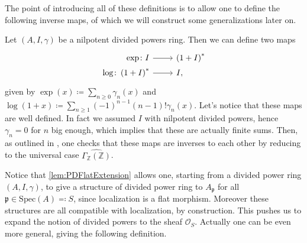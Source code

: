 \noindent
The point of introducing all of these definitions is to allow one to define the following
inverse maps, of which we will construct some generalizations later on.
\begin{defn}[]\label{defn:PDExponential}
	Let $\left(A, I, \gamma\right)$ be a nilpotent divided powers ring.
	Then we can define two maps
	\begin{equation*}
	\begin{tikzcd}[row sep = 0ex
		,/tikz/column 1/.append style={anchor=base east}
		,/tikz/column 2/.append style={anchor=base west}]
		\exp\colon I \arrow[r, "", rightarrow] &
		\left( 1 + I \right)^*\\
		\log\colon \left( 1 + I \right)^* \arrow[r, "", rightarrow] &
		I
	,\end{tikzcd}
	\end{equation*} 
	given by 
	$\exp (x) \coloneqq \sum_{n\geq 0} \gamma_n(x)$
	and $\log (1+x) \coloneqq \sum_{n\geq 1} 
	(-1)^{n-1} \left( n-1 \right)! \gamma_n(x)$.
	Let's notice that these maps are well defined.
	In fact we assumed $I$ with nilpotent divided powers,
	hence $\gamma_n = 0$ for $n$ big enough, which implies that
	these are actually finite sums.
	Then, as outlined in \cite[Chapter III, \S1.6]{Messing},
	one checks that these maps are inverses to each other
	by reducing to the universal case $\widehat{\Gamma_{\mathbb{Z}}(\mathbb{Z})}$.
\end{defn}


\begin{rem}[]
	Notice that \cref{lem:PDFlatExtension} allows one, starting from
	a divided power ring $\left(A, I, \gamma\right)$, to give
	a structure of divided power ring to $A_{\mathfrak{p}}$ for all
	$\mathfrak{p} \in \mathrm{Spec}(A) \eqqcolon S$, since localization is a flat morphism.
	Moreover these structures are all compatible with localization, by construction.
	This pushes us to expand the notion of divided powers to the
	sheaf $\mathcal{O}_{ S }$.
	Actually one can be even more general, giving the following definition.
\end{rem}


